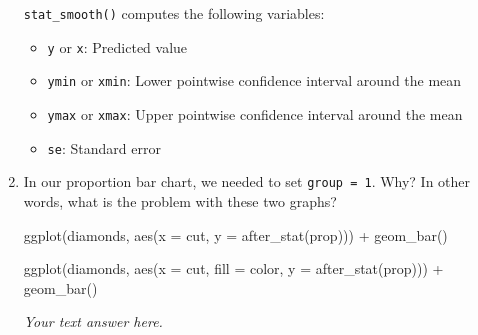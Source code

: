 \documentclass[
  letterpaper,
  DIV=11,
  numbers=noendperiod]{scrreprt}
\newenvironment{Shaded}{\begin{snugshade}}{\end{snugshade}}
\newcommand{\AttributeTok}[1]{\textcolor[rgb]{0.40,0.45,0.13}{#1}}
\newcommand{\FunctionTok}[1]{\textcolor[rgb]{0.28,0.35,0.67}{#1}}
\newcommand{\NormalTok}[1]{\textcolor[rgb]{0.00,0.23,0.31}{#1}}
\newcommand{\SpecialCharTok}[1]{\textcolor[rgb]{0.37,0.37,0.37}{#1}}
\providecommand{\tightlist}{%
  \setlength{\itemsep}{0pt}\setlength{\parskip}{0pt}}\usepackage{longtable,booktabs,array}
\begin{document}
\begin{enumerate}
\begin{tcolorbox}
  \texttt{stat\_smooth()} computes the following variables:

  \begin{itemize}
  \tightlist
  \item
    \texttt{y} or \texttt{x}: Predicted value
  \item
    \texttt{ymin} or \texttt{xmin}: Lower pointwise confidence interval
    around the mean
  \item
    \texttt{ymax} or \texttt{xmax}: Upper pointwise confidence interval
    around the mean
  \item
    \texttt{se}: Standard error
  \end{itemize}

  \end{tcolorbox}
\item
  In our proportion bar chart, we needed to set \texttt{group\ =\ 1}.
  Why? In other words, what is the problem with these two graphs?

\begin{Shaded}
\begin{Highlighting}[]
\FunctionTok{ggplot}\NormalTok{(diamonds, }\FunctionTok{aes}\NormalTok{(}\AttributeTok{x =}\NormalTok{ cut, }\AttributeTok{y =} \FunctionTok{after\_stat}\NormalTok{(prop))) }\SpecialCharTok{+} 
  \FunctionTok{geom\_bar}\NormalTok{()}
\end{Highlighting}
\end{Shaded}

\begin{Shaded}
\begin{Highlighting}[]
\FunctionTok{ggplot}\NormalTok{(diamonds, }\FunctionTok{aes}\NormalTok{(}\AttributeTok{x =}\NormalTok{ cut, }\AttributeTok{fill =}\NormalTok{ color, }\AttributeTok{y =} \FunctionTok{after\_stat}\NormalTok{(prop))) }\SpecialCharTok{+} 
  \FunctionTok{geom\_bar}\NormalTok{()}
\end{Highlighting}
\end{Shaded}

  \begin{tcolorbox}[enhanced jigsaw, left=2mm, rightrule=.15mm, bottomtitle=1mm, opacitybacktitle=0.6, leftrule=.75mm, opacityback=0, colframe=quarto-callout-note-color-frame, bottomrule=.15mm, coltitle=black, toptitle=1mm, colback=white, titlerule=0mm, colbacktitle=quarto-callout-note-color!10!white, title={Answer}, toprule=.15mm, breakable, arc=.35mm]

  \emph{Your text answer here.}

  \end{tcolorbox}


\end{enumerate}
\end{document}
